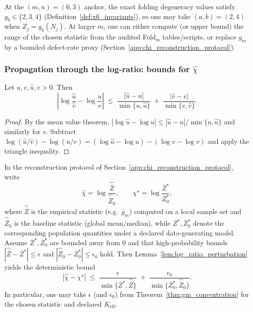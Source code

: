 \begin{remark}[Specialization to the $m=6$ anchor]\label{rem:gm_anchor_bounds}
At the $(m,n)=(6,3)$ anchor, the exact folding degeneracy values satisfy $g_6\in\{2,3,4\}$ (Definition~\ref{def:x6_invariants}), so one may take $(a,b)=(2,4)$ when $Z_j=g_6(N_j)$.
At larger $m$, one can either compute (or upper bound) the range of the chosen statistic from the audited Fold$_m$ tables/scripts, or replace $g_m$ by a bounded defect-rate proxy (Section~\ref{app:chi_reconstruction_protocol}).
\end{remark}

\subsubsection{Propagation through the log-ratio: bounds for \texorpdfstring{$\widehat\chi$}{chi-hat}}
\label{subsec:prot_to_cont_log_ratio}

\begin{lemma}\label{lem:log_ratio_perturbation}
Let $u,v,\widehat u,\widehat v>0$. Then
\[
\left|\log\frac{\widehat u}{\widehat v}-\log\frac{u}{v}\right|
\;\le\;
\frac{|\widehat u-u|}{\min\{u,\widehat u\}}
\;+\;
\frac{|\widehat v-v|}{\min\{v,\widehat v\}}.
\]
\end{lemma}
\begin{proof}
By the mean value theorem, $|\log\widehat u-\log u|\le |\widehat u-u|/\min\{u,\widehat u\}$ and similarly for $v$.
Subtract $\log(\widehat u/\widehat v)-\log(u/v)=(\log\widehat u-\log u)-(\log\widehat v-\log v)$ and apply the triangle inequality.
\end{proof}

\begin{corollary}\label{cor:chi_error_bar}
In the reconstruction protocol of Section~\ref{app:chi_reconstruction_protocol}, write
\[
\widehat\chi=\log\frac{\widehat{\overline Z}}{\widehat{\overline Z}_0},
\qquad
\chi^\star=\log\frac{\overline Z^\star}{\overline Z_0^\star},
\]
where $\widehat{\overline Z}$ is the empirical statistic (e.g.\ $\bar g_m$) computed on a local sample set and $\widehat{\overline Z}_0$ is the baseline statistic (global mean/median), while $\overline Z^\star,\overline Z_0^\star$ denote the corresponding population quantities under a declared data-generating model.
Assume $\overline Z^\star,\overline Z_0^\star$ are bounded away from $0$ and that high-probability bounds
$|\widehat{\overline Z}-\overline Z^\star|\le \epsilon$ and $|\widehat{\overline Z}_0-\overline Z_0^\star|\le \epsilon_0$ hold.
Then Lemma~\ref{lem:log_ratio_perturbation} yields the deterministic bound
\[
|\widehat\chi-\chi^\star|
\;\le\;
\frac{\epsilon}{\min\{\overline Z^\star,\widehat{\overline Z}\}}
\;+\;
\frac{\epsilon_0}{\min\{\overline Z_0^\star,\widehat{\overline Z}_0\}}.
\]
In particular, one may take $\epsilon$ (and $\epsilon_0$) from Theorem~\ref{thm:gm_concentration} for the chosen statistic and declared $K_{\mathrm{eff}}$.
\end{corollary}

